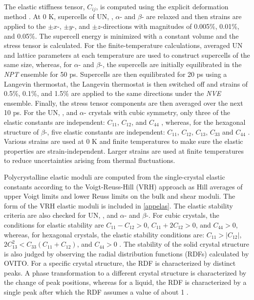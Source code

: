 \documentclass[preprint, 12pt]{elsarticle}
\begin{document}
The elastic stiffness tensor, $C_{ij}$, is computed using the explicit deformation method \cite{Clavier2017}. At 0 K, supercells of UN, , $\alpha$-  and $\beta$- are relaxed and then strains are applied to the $\pm x$-, $\pm y$-, and $ \pm z$-directions with magnitudes of 0.005\%, 0.01\%, and 0.05\%. The supercell energy is minimized with a constant volume and the stress tensor is calculated. For the finite-temperature calculations, averaged UN and  lattice parameters at each temperature are used to construct supercells of the same size, whereas, for $\alpha$- and $\beta$-, the supercells are initially equilibrated in the \textit{NPT} ensemble for 50 ps. Supercells are then equilibrated for 20 ps using a Langevin thermostat, the Langevin thermostat is then switched off and strains of 0.5\%, 0.1\%, and 1.5\% are applied to the same directions under the \textit{NVE} ensemble. Finally, the stress tensor components are then averaged over the next 10 ps. For the UN, , and $\alpha$- crystals with cubic symmetry, only three of the elastic constants are independent: $C_{11}$, $C_{12}$, and $C_{44}$ \cite{Meyers2008}, whereas, for the hexagonal structure of $\beta$-, five elastic constants are independent: $C_{11}$, $C_{12}$, $C_{13}$, $C_{33}$ and $C_{44}$ \cite{Boer2018}. Various strains are used at 0 K and finite temperatures to make sure the elastic properties are strain-independent. Larger strains are used at finite temperatures to reduce uncertainties arising from thermal fluctuations.

Polycrystalline elastic moduli are computed from the single-crystal elastic constants according to the Voigt-Reuss-Hill (VRH) approach \cite{Anderson1963, Meyers2008, Clavier2017} as Hill averages of upper Voigt limits and lower Reuss limits on the bulk and shear moduli. The form of the VRH elastic moduli is included in \ref{appelas}. The elastic stability criteria are also checked for UN, , and $\alpha$- and $\beta$-. For cubic crystals, the conditions for elastic stability are $C_{11} - C_{12} > 0$, $C_{11} + 2 C_{12} > 0$, and $C_{44} > 0$, whereas, for hexagonal crystals, the elastic stability conditions are: $C_{11} > |C_{12}|$, $2C_{13}^2 < C_{33}(C_{11}+C_{12})$, and $C_{44} > 0$ \cite{Mouhat2014}. The stability of the solid crystal structure is also judged by observing the radial distribution functions (RDFs) calculated by OVITO. For a specific crystal structure, the RDF is characterized by distinct peaks. A phase transformation to a different crystal structure is characterized by the change of peak positions, whereas for a liquid, the RDF is characterized by a single peak after which the RDF assumes a value of about 1 \cite{Rapaport2004}.
\end{document}
